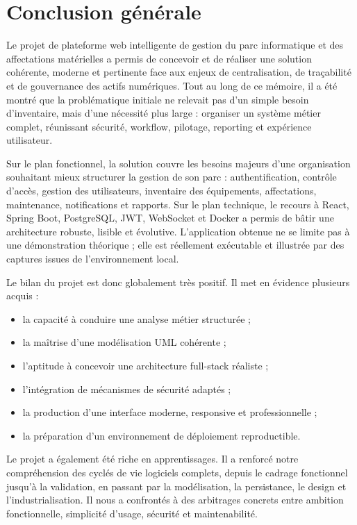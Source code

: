 ﻿\documentclass[12pt,a4paper,oneside]{report}
\begin{document}


\chapter*{Conclusion générale}

Le projet de plateforme web intelligente de gestion du parc informatique et des affectations matérielles a permis de concevoir et de réaliser une solution cohérente, moderne et pertinente face aux enjeux de centralisation, de traçabilité et de gouvernance des actifs numériques. Tout au long de ce mémoire, il a été montré que la problématique initiale ne relevait pas d'un simple besoin d'inventaire, mais d'une nécessité plus large : organiser un système métier complet, réunissant sécurité, workflow, pilotage, reporting et expérience utilisateur.

Sur le plan fonctionnel, la solution couvre les besoins majeurs d'une organisation souhaitant mieux structurer la gestion de son parc : authentification, contrôle d'accès, gestion des utilisateurs, inventaire des équipements, affectations, maintenance, notifications et rapports. Sur le plan technique, le recours à React, Spring Boot, PostgreSQL, JWT, WebSocket et Docker a permis de bâtir une architecture robuste, lisible et évolutive. L'application obtenue ne se limite pas à une démonstration théorique ; elle est réellement exécutable et illustrée par des captures issues de l'environnement local.

Le bilan du projet est donc globalement très positif. Il met en évidence plusieurs acquis :
\begin{itemize}
  \item la capacité à conduire une analyse métier structurée ;
  \item la maîtrise d'une modélisation UML cohérente ;
  \item l'aptitude à concevoir une architecture full-stack réaliste ;
  \item l'intégration de mécanismes de sécurité adaptés ;
  \item la production d'une interface moderne, responsive et professionnelle ;
  \item la préparation d'un environnement de déploiement reproductible.
\end{itemize}

Le projet a également été riche en apprentissages. Il a renforcé notre compréhension des cyclés de vie logiciels complets, depuis le cadrage fonctionnel jusqu'à la validation, en passant par la modélisation, la persistance, le design et l'industrialisation. Il nous a confrontés à des arbitrages concrets entre ambition fonctionnelle, simplicité d'usage, sécurité et maintenabilité.
\end{document}
